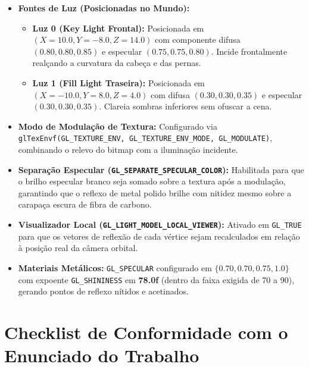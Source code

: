 \documentclass[11pt,a4paper]{article}
\begin{document}
\begin{itemize}[leftmargin=*]
    \item \textbf{Fontes de Luz (Posicionadas no Mundo):}
    \begin{itemize}[noitemsep]
        \item \textbf{Luz 0 (Key Light Frontal):} Posicionada em $(X=10.0, Y=-8.0, Z=14.0)$ com componente difusa $(0.80, 0.80, 0.85)$ e especular $(0.75, 0.75, 0.80)$. Incide frontalmente realçando a curvatura da cabeça e das pernas.
        \item \textbf{Luz 1 (Fill Light Traseira):} Posicionada em $(X=-10.0, Y=8.0, Z=4.0)$ com difusa $(0.30, 0.30, 0.35)$ e especular $(0.30, 0.30, 0.35)$. Clareia sombras inferiores sem ofuscar a cena.
    \end{itemize}
    \item \textbf{Modo de Modulação de Textura:} Configurado via \texttt{glTexEnvf(GL\_TEXTURE\_ENV, GL\_TEXTURE\_ENV\_MODE, GL\_MODULATE)}, combinando o relevo do bitmap com a iluminação incidente.
    \item \textbf{Separação Especular (\texttt{GL\_SEPARATE\_SPECULAR\_COLOR}):} Habilitada para que o brilho especular branco seja somado sobre a textura após a modulação, garantindo que o reflexo de metal polido brilhe com nitidez mesmo sobre a carapaça escura de fibra de carbono.
    \item \textbf{Visualizador Local (\texttt{GL\_LIGHT\_MODEL\_LOCAL\_VIEWER}):} Ativado em \texttt{GL\_TRUE} para que os vetores de reflexão de cada vértice sejam recalculados em relação à posição real da câmera orbital.
    \item \textbf{Materiais Metálicos:} \texttt{GL\_SPECULAR} configurado em $\{0.70, 0.70, 0.75, 1.0\}$ com expoente \texttt{GL\_SHININESS} em \textbf{78.0f} (dentro da faixa exigida de 70 a 90), gerando pontos de reflexo nítidos e acetinados.
\end{itemize}

\section{Checklist de Conformidade com o Enunciado do Trabalho}
\end{document}
